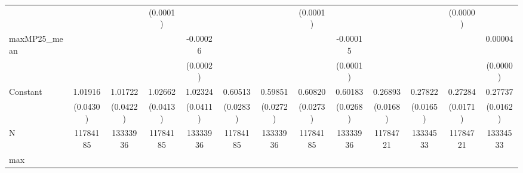 {\begin{tabular}{l*{12}{c}}
            &                     &                     &    (0.0001)         &                     &                     &                     &    (0.0001)         &                     &                     &                     &    (0.0000)         &                     \\
maxMP25\_mean&                     &                     &                     &    -0.00026\sym{*}  &                     &                     &                     &    -0.00015         &                     &                     &                     &     0.00004         \\
            &                     &                     &                     &    (0.0002)         &                     &                     &                     &    (0.0001)         &                     &                     &                     &    (0.0000)         \\
Constant    &     1.01916\sym{***}&     1.01722\sym{***}&     1.02662\sym{***}&     1.02324\sym{***}&     0.60513\sym{***}&     0.59851\sym{***}&     0.60820\sym{***}&     0.60183\sym{***}&     0.26893\sym{***}&     0.27822\sym{***}&     0.27284\sym{***}&     0.27737\sym{***}\\
            &    (0.0430)         &    (0.0422)         &    (0.0413)         &    (0.0411)         &    (0.0283)         &    (0.0272)         &    (0.0273)         &    (0.0268)         &    (0.0168)         &    (0.0165)         &    (0.0171)         &    (0.0162)         \\
\midrule
N           &    11784185         &    13333936         &    11784185         &    13333936         &    11784185         &    13333936         &    11784185         &    13333936         &    11784721         &    13334533         &    11784721         &    13334533         \\
max         &                     &                     &                     &                     &                     &                     &                     &                     &                     &                     &                     &                     \\
\bottomrule
\end{tabular}
}
